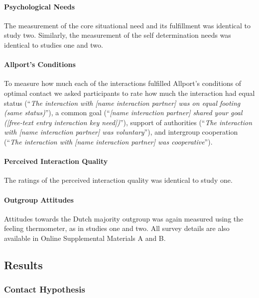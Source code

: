\paragraph{Psychological Needs}

The measurement of the core situational need and its fulfillment was
identical to study two. Similarly, the measurement of the self
determination needs was identical to studies one and two.

\paragraph{Allport's Conditions}

To measure how much each of the interactions fulfilled Allport's
conditions of optimal contact we asked participants to rate how much the
interaction had equal status
(``\textit{The interaction with [name interaction partner] was on equal footing (same status)}''),
a common goal
(``\textit{[name interaction partner] shared your goal ([free-text entry interaction key need])}''),
support of authorities
(``\textit{The interaction with [name interaction partner] was voluntary}''),
and intergroup cooperation
(``\textit{The interaction with [name interaction partner] was cooperative}'').

\paragraph{Perceived Interaction Quality}

The ratings of the perceived interaction quality was identical to study
one.

\paragraph{Outgroup Attitudes}

Attitudes towards the Dutch majority outgroup was again measured using
the feeling thermometer, as in studies one and two. All survey details
are also available in Online Supplemental Materials A and B.




\subsection{Results}

\subsubsection{Contact Hypothesis}

